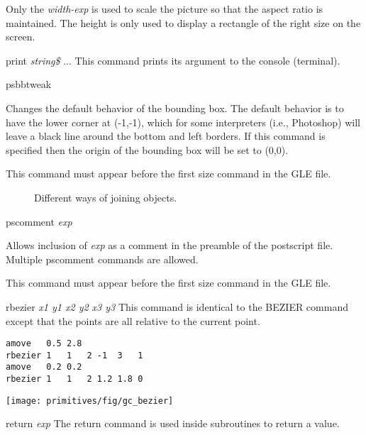 \begin{commanddescription}
Only the {\it width-exp} is used to scale the picture so that the
aspect ratio is maintained. The
height is only used to display a rectangle of the right size on the screen.

\item[{\sf print {\it string\$} $\ldots$}]
 This command prints its argument to the console (terminal).

\item[{\sf psbbtweak}]

Changes the default behavior of the bounding box.  The default behavior is to have the lower corner at (-1,-1), which for some interpreters (i.e., Photoshop) will leave a black line around the bottom and left borders.  If this command is specified then the origin of the bounding box will be set to (0,0).

This command must appear before the first {\sf size} command in the GLE file.

\begin{figure}
\centering
\mbox{}
\caption{\label{joicur:fig}Different ways of joining objects.}
\end{figure}

\item[{\sf pscomment} {\it exp}]

Allows inclusion of {\it exp} as a comment in the preamble of the postscript file.  Multiple {\sf pscomment} commands are allowed.

This command must appear before the first {\sf size} command in the GLE file.

\item[{\sf rbezier {\it x1 y1 x2 y2 x3 y3}}]
 
This command is identical to the BEZIER command except that the points are
all relative to the current point.

\begin{minipage}[c]{8cm}
\begin{Verbatim}
amove   0.5 2.8
rbezier 1   1   2 -1  3   1
amove   0.2 0.2
rbezier 1   1   2 1.2 1.8 0
\end{Verbatim}
\end{minipage}
\hfill
\begin{minipage}[c]{7cm}
\mbox{\texttt{[image: primitives/fig/gc\_bezier]}}
\end{minipage}

\item[{\sf return} {\it exp}]
The {\sf return} command is used inside subroutines to return a value.


\end{commanddescription}
